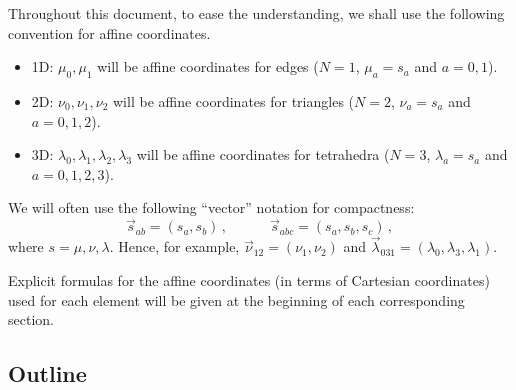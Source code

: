 Throughout this document, to ease the understanding, we shall use the following convention for affine coordinates.
\begin{itemize}
	\item 1D: $\mu_0,\mu_1$ will be affine coordinates for edges ($N=1$, $\mu_a=s_a$ and $a=0,1$).
	\item 2D: $\nu_0,\nu_1,\nu_2$ will be affine coordinates for triangles ($N=2$, $\nu_a=s_a$ and $a=0,1,2$).
	\item 3D: $\lambda_0,\lambda_1,\lambda_2,\lambda_3$ will be affine coordinates for tetrahedra ($N=3$, $\lambda_a=s_a$ and $a=0,1,2,3$).
\end{itemize}
We will often use the following ``vector'' notation for compactness:
\begin{equation}
	\vec{s}_{ab}=(s_a,s_b)\,,\quad\qquad\vec{s}_{abc}=(s_a,s_b,s_c)\,,
\end{equation}
where $s=\mu,\nu,\lambda$. Hence, for example, $\vec{\nu}_{12}=(\nu_1,\nu_2)$ and $\vec{\lambda}_{031}=(\lambda_0,\lambda_3,\lambda_1)$.

Explicit formulas  for the affine coordinates (in terms of Cartesian coordinates) used for each element will be given at the beginning of each corresponding section.


\subsection{Outline}

